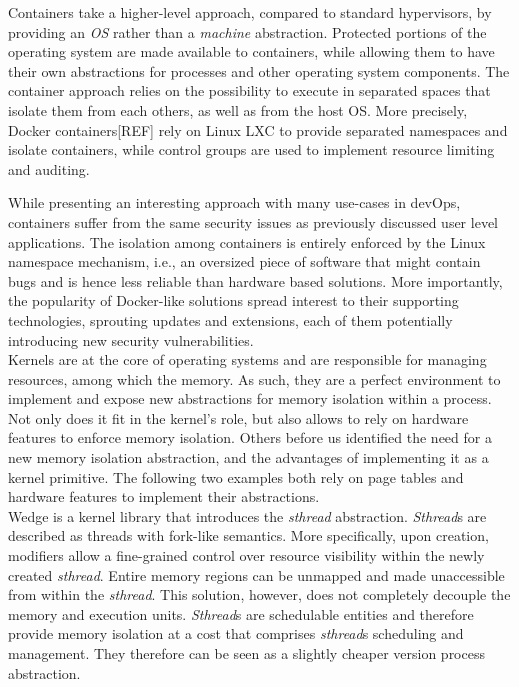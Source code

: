 \documentclass[letterpaper,twocolumn,10pt]{article}
\begin{document}
Containers take a higher-level approach, compared to standard hypervisors, by providing an \emph{OS} rather than a \emph{machine} abstraction.
Protected portions of the operating system are made available to containers, while allowing them to have their own abstractions for processes and other operating system components.
The container approach relies on the possibility to execute in separated spaces that isolate them from each others, as well as from the host OS.
More precisely, Docker containers[REF] rely on Linux LXC to provide separated namespaces and isolate containers, while control groups are used to implement resource limiting and auditing.

While presenting an interesting approach with many use-cases in devOps, containers suffer from the same security issues as previously discussed user level applications.
The isolation among containers is entirely enforced by the Linux namespace mechanism, i.e., an oversized piece of software that might contain bugs and is hence less reliable than hardware based solutions.
More importantly, the popularity of Docker-like solutions spread interest to their supporting technologies, sprouting updates and extensions, each of them potentially introducing new security vulnerabilities.\\


Kernels are at the core of operating systems and are responsible for managing resources, among which the memory.
As such, they are a perfect environment to implement and expose new abstractions for memory isolation within a process.
Not only does it fit in the kernel's role, but also allows to rely on hardware features to enforce memory isolation.
Others\cite{DBLP:conf/osdi/LittonVE0BD16,DBLP:conf/nsdi/BittauMHK08} before us identified the need for a new memory isolation abstraction, and the advantages of implementing it as a kernel primitive.
The following two examples both rely on page tables and hardware features to implement their abstractions. \\

Wedge\cite{DBLP:conf/nsdi/BittauMHK08} is a kernel library that introduces the \emph{sthread} abstraction.
\emph{Sthread}s are described as threads with fork-like semantics.
More specifically, upon creation, modifiers allow a fine-grained control over resource visibility within the newly created \emph{sthread}.
Entire memory regions can be unmapped and made unaccessible from within the \emph{sthread}.
This solution, however, does not completely decouple the memory and execution units.
\emph{Sthread}s are schedulable entities and therefore provide memory isolation at a cost that comprises \emph{sthread}s scheduling and management.
They therefore can be seen as a slightly cheaper version process abstraction.\\
\end{document}
